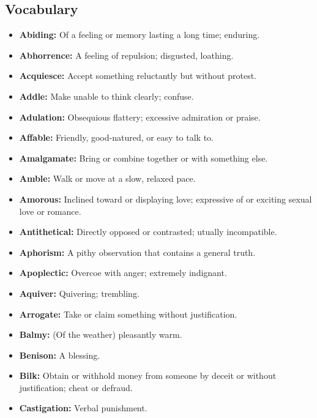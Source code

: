 \documentclass[crop=false,class=book]{standalone}
\begin{document}
        \subsection{Vocabulary}
            \begin{itemize}[noitemsep]
                \item \textbf{Abiding:} Of a feeling or memory lasting a long time; enduring.
                \item \textbf{Abhorrence:} A feeling of repulsion; disgusted, loathing.
                \item \textbf{Acquiesce:} Accept something reluctantly but without protest.
                \item \textbf{Addle:} Make unable to think clearly; confuse.
                \item \textbf{Adulation:} Obsequious flattery; excessive admiration or praise.
                \item \textbf{Affable:} Friendly, good-natured, or easy to talk to.
                \item \textbf{Amalgamate:} Bring or combine together or with something else.
                \item \textbf{Amble:} Walk or move at a slow, relaxed pace.
                \item \textbf{Amorous:} Inclined toward or displaying love; expressive of or
                      exciting sexual love or romance.
                \item \textbf{Antithetical:} Directly opposed or contrasted; utually incompatible.
                \item \textbf{Aphorism:} A pithy observation that contains a general truth.
                \item \textbf{Apoplectic:} Overcoe with anger; extremely indignant.
                \item \textbf{Aquiver:} Quivering; trembling.
                \item \textbf{Arrogate:} Take or claim something without justification.
                \item \textbf{Balmy:} (Of the weather) pleasantly warm.
                \item \textbf{Benison:} A blessing.
                \item \textbf{Bilk:} Obtain or withhold money from someone by deceit or
                      without justification; cheat or defraud.
                \item \textbf{Castigation:} Verbal punishment.

\end{itemize}
\end{document}
